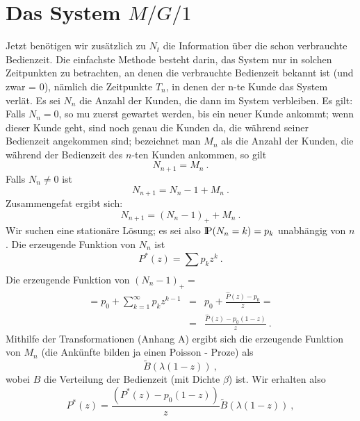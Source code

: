 \section{Das System $M/G/1$}
Jetzt benötigen wir zusätzlich zu $N_{t}$ die Information über die
schon verbrauchte Bedienzeit. Die einfachste Methode besteht darin, das
System nur in solchen Zeitpunkten zu betrachten, an denen die verbrauchte
Bedienzeit bekannt ist (und zwar = 0), nämlich die Zeitpunkte $T_{n}$, in
denen der n-te Kunde das System verlä\3t. Es sei $N_{n}$ die Anzahl der
Kunden, die dann im System verbleiben. Es gilt: Falls $N_{n}=0$, so mu\3
zuerst gewartet werden, bis ein neuer Kunde ankommt; wenn dieser Kunde
geht, sind noch genau die Kunden da, die während seiner Bedienzeit
angekommen sind; bezeichnet man $M_{n}$ als die Anzahl der Kunden, die
während der Bedienzeit des $n$-ten Kunden ankommen, so gilt
\begin{displaymath}
N_{n+1} = M_{n} ~.
\end{displaymath}
Falls $N_{n} \not= 0$ ist
\begin{displaymath}
N_{n+1} = N_{n} - 1 + M_{n} ~.
\end{displaymath}
Zusammengefa\3t ergibt sich:
\begin{displaymath}
N_{n+1} = (N_{n} - 1)_{+} + M_{n} ~.
\end{displaymath}
Wir suchen eine stationäre Lösung; es sei also ${\rm I\kern-0.2em P} (N_{n}=k)=p_{k}$
unabhängig von $n$. Die erzeugende Funktion von $N_{n}$ ist
\begin{displaymath}
P^{*}(z) = \sum_{}^{}p_{k}z^{k} ~.
\end{displaymath}
Die erzeugende Funktion von $(N_{n}-1)_{+}=$
\begin{eqnarray*}
= p_{0} + \sum_{k=1}^{\infty} p_{k} z^{k-1} &=& p_{0}+ \frac{\hat P
(z) - p_{0}}{z} = \\
 &=& \frac{\hat P(z) - p_{0}(1-z)}{z} ~.
\end{eqnarray*}
Mithilfe der Transformationen (Anhang A) ergibt sich die erzeugende Funktion von $M_{n}$
(die Ankünfte bilden ja einen Poisson - Proze\3) als
\begin{displaymath}
\tilde B (\lambda(1 - z)) ~,
\end{displaymath}
wobei $B$ die Verteilung der Bedienzeit (mit Dichte $\beta$) ist. Wir
erhalten also
\begin{displaymath}
P^{*}(z) = \frac{(P^{*}(z) - p_{0}(1-z))}{z}  \tilde B (\lambda(1-z)) ~,
\end{displaymath}
